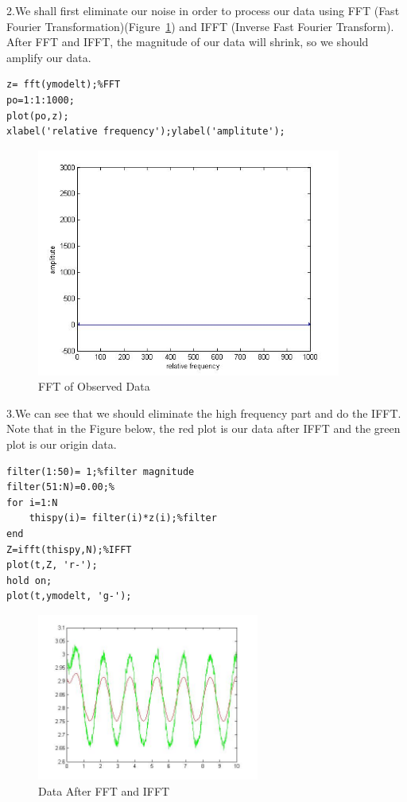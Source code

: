 \documentclass[a4paper]{article}
\begin{document}
2.We shall first eliminate our noise in order to process our data using FFT (Fast Fourier Transformation)(Figure~\ref{4-4}) and IFFT (Inverse Fast Fourier Transform). After FFT and IFFT, the magnitude of our data will shrink, so we should amplify our data.
\begin{verbatim}
z= fft(ymodelt);%FFT
po=1:1:1000;
plot(po,z);
xlabel('relative frequency');ylabel('amplitute');
\end{verbatim}

\begin{figure}[!htb]
\centering
\includegraphics[width=10cm]{4-4.jpg}
\caption{FFT of Observed Data}
\label{4-4}
\end{figure}

3.We can see that we should eliminate the high frequency part and do the IFFT. Note that in the Figure below, the red plot is our data after IFFT and the green plot is our origin data.
\begin{verbatim}
filter(1:50)= 1;%filter magnitude
filter(51:N)=0.00;%
for i=1:N
    thispy(i)= filter(i)*z(i);%filter
end
Z=ifft(thispy,N);%IFFT
plot(t,Z, 'r-');
hold on;
plot(t,ymodelt, 'g-');
\end{verbatim}

\begin{figure}[!htb]
\centering
\includegraphics[width=7.3cm]{4-5.jpg}
\caption{Data After FFT and IFFT}
\label{4-5}
\end{figure}
\end{document}
